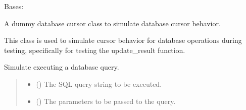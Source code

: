 \documentclass[letterpaper,10pt,english]{sphinxmanual}
\begin{document}
\begin{fulllineitems}
\label{\detokenize{test.data_storage:test.data_storage.test_llm_analyse.DummyCursor}}
\pysigstartsignatures
\pysigline
{}
\pysigstopsignatures
\sphinxAtStartPar
Bases: 

\sphinxAtStartPar
A dummy database cursor class to simulate database cursor behavior.

\sphinxAtStartPar
This class is used to simulate cursor behavior for database operations
during testing, specifically for testing the update\_result function.

\begin{fulllineitems}
\label{\detokenize{test.data_storage:test.data_storage.test_llm_analyse.DummyCursor.execute}}
\pysigstartsignatures
\pysiglinewithargsret
{}
{\sphinxparamcomma {}}
{}
\pysigstopsignatures
\sphinxAtStartPar
Simulate executing a database query.
\begin{quote}\begin{description}
\begin{itemize}
\item {} 
\sphinxAtStartPar
{} () \textendash{} The SQL query string to be executed.

\item {} 
\sphinxAtStartPar
{} () \textendash{} The parameters to be passed to the query.

\end{itemize}

\end{description}\end{quote}

\end{fulllineitems}


\end{fulllineitems}
\end{document}
